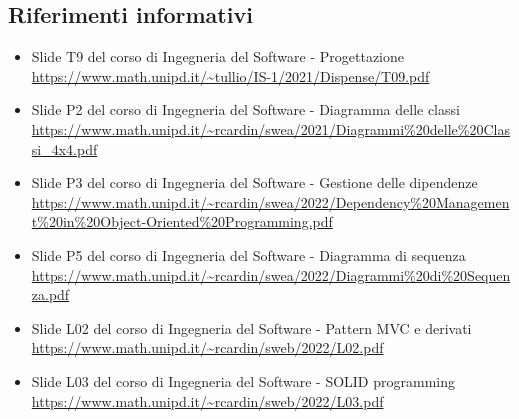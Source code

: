 \subsection{Riferimenti informativi}
\begin{itemize}
    \item Slide T9 del corso di Ingegneria del Software - Progettazione \\
    \url{https://www.math.unipd.it/~tullio/IS-1/2021/Dispense/T09.pdf}
    \item Slide P2 del corso di Ingegneria del Software - Diagramma delle classi \\
    \url{https://www.math.unipd.it/~rcardin/swea/2021/Diagrammi%20delle%20Classi_4x4.pdf}
    \item Slide P3 del corso di Ingegneria del Software - Gestione delle dipendenze \\
    \url{https://www.math.unipd.it/~rcardin/swea/2022/Dependency%20Management%20in%20Object-Oriented%20Programming.pdf}
    \item Slide P5 del corso di Ingegneria del Software - Diagramma di sequenza \\
    \url{https://www.math.unipd.it/~rcardin/swea/2022/Diagrammi%20di%20Sequenza.pdf}
    \item Slide L02 del corso di Ingegneria del Software - Pattern MVC e derivati \\
    \url{https://www.math.unipd.it/~rcardin/sweb/2022/L02.pdf}
    \item Slide L03 del corso di Ingegneria del Software - SOLID programming \\
    \url{https://www.math.unipd.it/~rcardin/sweb/2022/L03.pdf}
\end{itemize}
